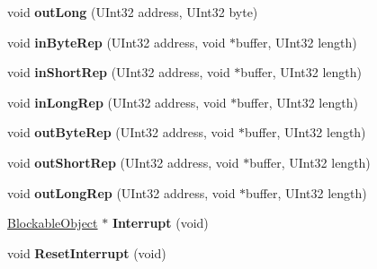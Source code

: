 \begin{DoxyCompactItemize}
\item 
\mbox{\label{class_a_t_a_driver_node___p_c_i_a378a53cc83790ba2c5991b28587f1dc2}} 
void {\bfseries out\+Long} (U\+Int32 address, U\+Int32 byte)
\item 
\mbox{\label{class_a_t_a_driver_node___p_c_i_a7a44c25032f56987a24038b1a09df602}} 
void {\bfseries in\+Byte\+Rep} (U\+Int32 address, void $\ast$buffer, U\+Int32 length)
\item 
\mbox{\label{class_a_t_a_driver_node___p_c_i_ad32d892b3955c8bbcd29ad5bdf7f6174}} 
void {\bfseries in\+Short\+Rep} (U\+Int32 address, void $\ast$buffer, U\+Int32 length)
\item 
\mbox{\label{class_a_t_a_driver_node___p_c_i_ae52364b6780b52da18b066e00ee2f062}} 
void {\bfseries in\+Long\+Rep} (U\+Int32 address, void $\ast$buffer, U\+Int32 length)
\item 
\mbox{\label{class_a_t_a_driver_node___p_c_i_a0c93318ee575386ccfe0f8abfb0d7b53}} 
void {\bfseries out\+Byte\+Rep} (U\+Int32 address, void $\ast$buffer, U\+Int32 length)
\item 
\mbox{\label{class_a_t_a_driver_node___p_c_i_a91715178936488341c6b85f616b5f68a}} 
void {\bfseries out\+Short\+Rep} (U\+Int32 address, void $\ast$buffer, U\+Int32 length)
\item 
\mbox{\label{class_a_t_a_driver_node___p_c_i_ac03497012e6c8778e0da03e727370fb9}} 
void {\bfseries out\+Long\+Rep} (U\+Int32 address, void $\ast$buffer, U\+Int32 length)
\item 
\mbox{\label{class_a_t_a_driver_node___p_c_i_acfe6c674f857bd166f4c30317a062041}} 
\hyperlink{class_blockable_object}{Blockable\+Object} $\ast$ {\bfseries Interrupt} (void)
\item 
\mbox{\label{class_a_t_a_driver_node___p_c_i_a8e1814f837bd766c3aa4c6aca0353f9f}} 
void {\bfseries Reset\+Interrupt} (void)
\item 

\end{DoxyCompactItemize}
